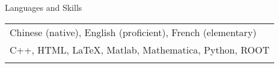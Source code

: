\documentclass[letterpaper,11pt,oneside]{article}
\begin{document}
 \raggedright
 \Large{Languages and Skills} \\
 \normalsize
 \begin{flushleft}
\hspace{1cm}
 \begin{tabular}{@{} l}
     Chinese (native), English (proficient), French (elementary)\\
     C++, HTML, \LaTeX, Matlab, Mathematica, Python, ROOT \\
     \\
      \end{tabular}
\end{flushleft}






\clearpage
\end{document}
